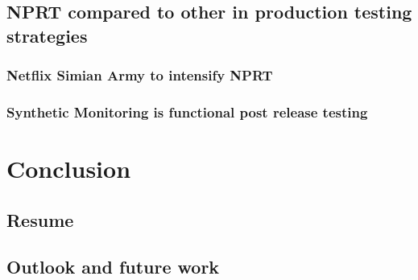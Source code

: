 \section{NPRT compared to other in production testing strategies}
\subsection{Netflix Simian Army to intensify NPRT}
\subsection{Synthetic Monitoring is functional post release testing}

\chapter{Conclusion}
\section{Resume}
\section{Outlook and future work}





